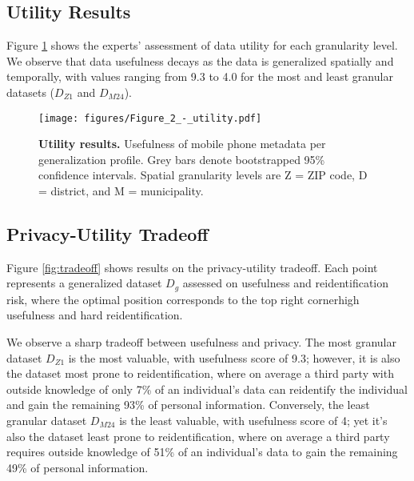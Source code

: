 \documentclass[12pt]{article}
\begin{document}
\subsection{\textbf{Utility Results}}
\label{sec:results_use}
\vspace{8pt}

Figure \ref{fig:usefulness} shows the experts’ assessment of data utility for each granularity level. We observe that data usefulness decays as the data is generalized spatially and temporally, with values ranging from 9.3 to 4.0 for the most and least granular datasets ($D_{Z1}$ and $D_{M24}$).

\begin{figure}[h!]
\centering
\texttt{[image: figures/Figure\_2\_-\_utility.pdf]}
\caption{\textbf{Utility results.} Usefulness of mobile phone metadata per generalization profile. Grey bars denote bootstrapped 95\% confidence intervals. Spatial granularity levels are Z = ZIP code, D = district, and M = municipality. }
\label{fig:usefulness}
\end{figure}



\subsection{\textbf{Privacy-Utility Tradeoff}}
\vspace{8pt}


Figure \ref{fig:tradeoff} shows results on the privacy-utility tradeoff. Each point represents a generalized dataset $D_g$ assessed on usefulness and reidentification risk, where the optimal position corresponds to the top right corner\textemdash high usefulness and hard reidentification.

We observe a sharp tradeoff between usefulness and privacy. The most granular dataset $D_{Z1}$ is the most valuable, with usefulness score of 9.3; however, it is also the dataset most prone to reidentification, where on average a third party with outside knowledge of only 7\% of an individual's data can reidentify the individual and gain the remaining 93\% of personal information. Conversely, the least granular dataset $D_{M24}$ is the least valuable, with usefulness score of 4; yet it's also the dataset least prone to reidentification, where on average a third party requires outside knowledge of 51\% of an individual's data to gain the remaining 49\% of personal information.
\end{document}
